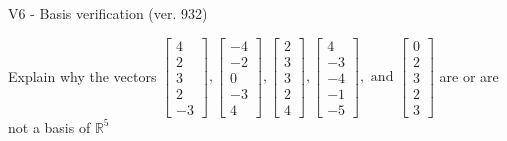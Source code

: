 \begin{exercise}
  \begin{exerciseTitle}V6 - Basis verification (ver. 932)\end{exerciseTitle}
  \begin{exerciseStatement}
    Explain why the vectors \(\left[\begin{array}{r}
4 \\
2 \\
3 \\
2 \\
-3
\end{array}\right] , \left[\begin{array}{r}
-4 \\
-2 \\
0 \\
-3 \\
4
\end{array}\right] , \left[\begin{array}{r}
2 \\
3 \\
3 \\
2 \\
4
\end{array}\right] , \left[\begin{array}{r}
4 \\
-3 \\
-4 \\
-1 \\
-5
\end{array}\right] , \text{ and } \left[\begin{array}{r}
0 \\
2 \\
3 \\
2 \\
3
\end{array}\right]\) are or are not a basis of \(\mathbb{R}^5\)	



\end{exerciseStatement}
\end{exercise}
